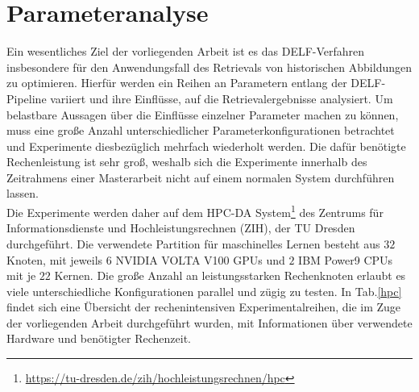 \section{Parameteranalyse}

Ein wesentliches Ziel der vorliegenden Arbeit ist es das DELF-Verfahren insbesondere für den Anwendungsfall des Retrievals von historischen Abbildungen zu optimieren. Hierfür werden ein Reihen an Parametern entlang der DELF-Pipeline variiert und ihre Einflüsse, auf die Retrievalergebnisse analysiert. Um belastbare Aussagen über die Einflüsse einzelner Parameter machen zu können, muss eine große Anzahl unterschiedlicher Parameterkonfigurationen betrachtet und Experimente diesbezüglich mehrfach wiederholt werden. Die dafür benötigte Rechenleistung ist sehr groß, weshalb sich die Experimente innerhalb des Zeitrahmens einer Masterarbeit nicht auf einem normalen System durchführen lassen.\\
Die Experimente werden daher auf dem HPC-DA System\footnote{\url{https://tu-dresden.de/zih/hochleistungsrechnen/hpc}} des Zentrums für Informationsdienste und Hochleistungsrechnen (ZIH), der TU Dresden durchgeführt. Die verwendete Partition für maschinelles Lernen besteht aus $32$ Knoten, mit jeweils $6$ NVIDIA VOLTA V100 GPUs und $2$ IBM Power9 CPUs mit je $22$ Kernen. Die große Anzahl an leistungsstarken Rechenknoten erlaubt es viele unterschiedliche Konfigurationen parallel und zügig zu testen.
In Tab.\ref{hpc} findet sich eine Übersicht der rechenintensiven Experimentalreihen, die im Zuge der vorliegenden Arbeit durchgeführt wurden, mit Informationen über verwendete Hardware und benötigter Rechenzeit.

